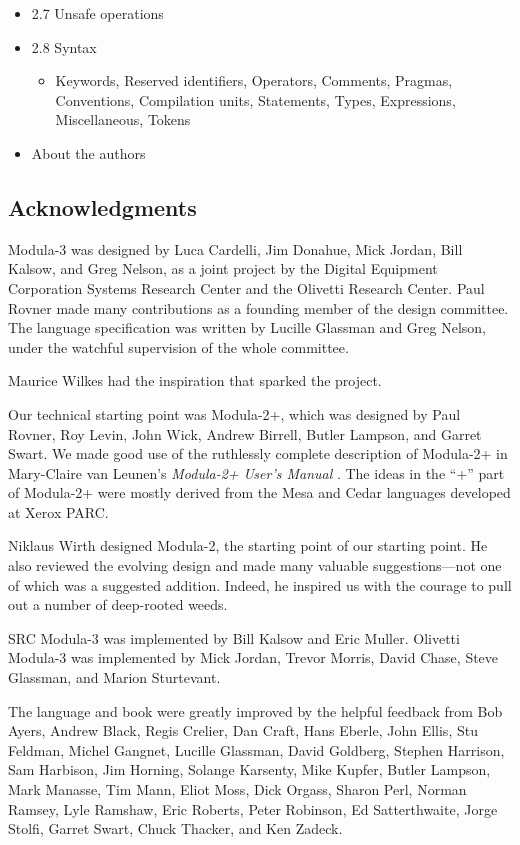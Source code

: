 \documentclass[10pt]{article}
\begin{document}
\begin{itemize}
\item 2.7 Unsafe operations
\item 2.8 Syntax
  \begin{itemize}
  \item Keywords, Reserved identifiers, Operators, Comments, Pragmas,
    Conventions, Compilation units, Statements, Types, Expressions,
    Miscellaneous, Tokens
  \end{itemize}

\item About the authors
\end{itemize}

\subsection*{Acknowledgments}

Modula-3 was designed by Luca Cardelli, Jim Donahue, Mick Jordan, Bill Kalsow,
and Greg Nelson, as a joint project by the Digital Equipment Corporation
Systems Research Center and the Olivetti Research Center.  Paul Rovner made
many contributions as a founding member of the design committee.  The language
specification was written by Lucille Glassman and Greg Nelson, under the
watchful supervision of the whole committee.

Maurice Wilkes had the inspiration that sparked the project.

Our technical starting point was Modula-2+, which was designed by Paul Rovner,
Roy Levin, John Wick, Andrew Birrell, Butler Lampson, and Garret Swart.  We
made good use of the ruthlessly complete description of Modula-2+ in
Mary-Claire van Leunen's \emph{Modula-2+ User's Manual} .  The ideas in the
``+'' part of Modula-2+ were mostly derived from the Mesa and Cedar languages
developed at Xerox PARC.

Niklaus Wirth designed Modula-2, the starting point of our starting point.  He
also reviewed the evolving design and made many valuable suggestions---not one
of which was a suggested addition.  Indeed, he inspired us with the courage to
pull out a number of deep-rooted weeds.

SRC Modula-3 was implemented by Bill Kalsow and Eric Muller.  Olivetti Modula-3
was implemented by Mick Jordan, Trevor Morris, David Chase, Steve Glassman,
and Marion Sturtevant.

The language and book were greatly improved by the helpful feedback from Bob
Ayers, Andrew Black, Regis Crelier, Dan Craft, Hans Eberle, John Ellis, Stu
Feldman, Michel Gangnet, Lucille Glassman, David Goldberg, Stephen Harrison,
Sam Harbison, Jim Horning, Solange Karsenty, Mike Kupfer, Butler Lampson, Mark
Manasse, Tim Mann, Eliot Moss, Dick Orgass, Sharon Perl, Norman Ramsey, Lyle
Ramshaw, Eric Roberts, Peter Robinson, Ed Satterthwaite, Jorge Stolfi, Garret
Swart, Chuck Thacker, and Ken Zadeck.
\end{document}
